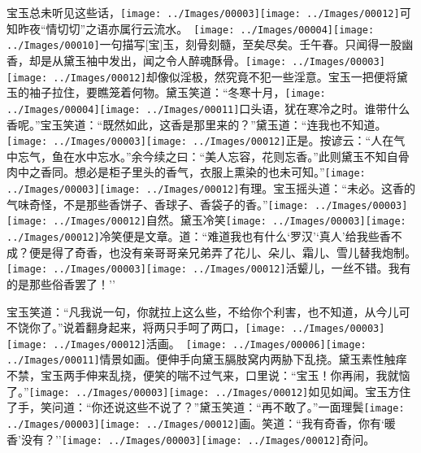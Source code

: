宝玉总未听见这些话，{\texttt{[image: ../Images/00003]}\texttt{[image: ../Images/00012]}\footnotesize \kaishu 可知昨夜``情切切''之语亦属行云流水。　{\texttt{[image: ../Images/00004]}\texttt{[image: ../Images/00010]}\footnotesize \kaishu 一句描写{[}宝{]}玉，刻骨刻髓，至矣尽矣。壬午春。}}只闻得一股幽香，却是从黛玉袖中发出，闻之令人醉魂酥骨。{\texttt{[image: ../Images/00003]}\texttt{[image: ../Images/00012]}\footnotesize \kaishu 却像似淫极，然究竟不犯一些淫意。}宝玉一把便将黛玉的袖子拉住，要瞧笼着何物。黛玉笑道：``冬寒十月，{\texttt{[image: ../Images/00004]}\texttt{[image: ../Images/00011]}\footnotesize \kaishu 口头语，犹在寒冷之时。}谁带什么香呢。''宝玉笑道：``既然如此，这香是那里来的？''黛玉道：``连我也不知道。{\texttt{[image: ../Images/00003]}\texttt{[image: ../Images/00012]}\footnotesize \kaishu 正是。按谚云：``人在气中忘气，鱼在水中忘水。''余今续之曰：``美人忘容，花则忘香。''此则黛玉不知自骨肉中之香同。}想必是柜子里头的香气，衣服上熏染的也未可知。''{\texttt{[image: ../Images/00003]}\texttt{[image: ../Images/00012]}\footnotesize \kaishu 有理。}宝玉摇头道：``未必。这香的气味奇怪，不是那些香饼子、香球子、香袋子的香。''{\texttt{[image: ../Images/00003]}\texttt{[image: ../Images/00012]}\footnotesize \kaishu 自然。}黛玉冷笑{\texttt{[image: ../Images/00003]}\texttt{[image: ../Images/00012]}\footnotesize \kaishu 冷笑便是文章。}道：``难道我也有什么`罗汉'`真人'给我些香不成？便是得了奇香，也没有亲哥哥亲兄弟弄了花儿、朵儿、霜儿、雪儿替我炮制。{\texttt{[image: ../Images/00003]}\texttt{[image: ../Images/00012]}\footnotesize \kaishu 活颦儿，一丝不错。}我有的是那些俗香罢了！''

宝玉笑道：``凡我说一句，你就拉上这么些，不给你个利害，也不知道，从今儿可不饶你了。''说着翻身起来，将两只手呵了两口，{\texttt{[image: ../Images/00003]}\texttt{[image: ../Images/00012]}\footnotesize \kaishu 活画。　\texttt{[image: ../Images/00006]}\texttt{[image: ../Images/00011]}\footnotesize \kaishu 情景如画。}便伸手向黛玉膈肢窝内两胁下乱挠。黛玉素性触痒不禁，宝玉两手伸来乱挠，便笑的喘不过气来，口里说：``宝玉！你再闹，我就恼了。''{\texttt{[image: ../Images/00003]}\texttt{[image: ../Images/00012]}\footnotesize \kaishu 如见如闻。}宝玉方住了手，笑问道：``你还说这些不说了？''黛玉笑道：``再不敢了。''一面理鬓{\texttt{[image: ../Images/00003]}\texttt{[image: ../Images/00012]}\footnotesize \kaishu 画。}笑道：``我有奇香，你有`暖香'没有？''{\texttt{[image: ../Images/00003]}\texttt{[image: ../Images/00012]}\footnotesize \kaishu 奇问。}

